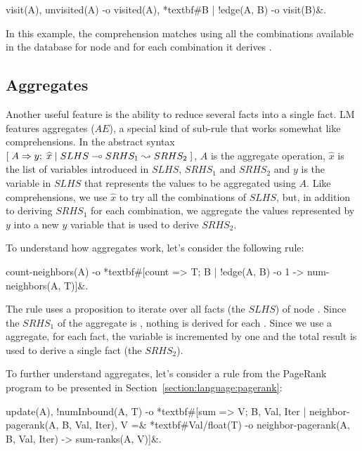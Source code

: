 \begin{Code}[commandchars=\*\#\&]
visit(A),
unvisited(A)
   -o visited(A),
      *textbf#{B | !edge(A, B) -o visit(B)}&.
\end{Code}

In this example, the comprehension matches  using all the
combinations available in the database for node  and for each
combination it derives .

\subsection{Aggregates}

Another useful feature is the ability to reduce several facts
into a single fact. LM features aggregates ($AE$), a special kind of sub-rule
that works somewhat like comprehensions. In the abstract syntax
$[\; A \Rightarrow y; \; \widehat{x} \; | \; SLHS \multimap SRHS_1 \leadsto SRHS_2 \;]$, $A$ is the aggregate
operation, $\widehat{x}$ is the list of variables introduced in $SLHS$, $SRHS_1$
and $SRHS_2$ and $y$ is the variable in $SLHS$ that represents the values to be
aggregated using $A$. Like comprehensions, we use $\widehat{x}$ to try all the
combinations of $SLHS$, but, in addition to deriving $SRHS_1$ for each
combination, we aggregate the values represented by $y$ into a new $y$ variable
that is used to derive $SRHS_2$.

To understand how aggregates work, let's consider the following rule:

\begin{Code}[commandchars=\*\#\&]
count-neighbors(A) -o *textbf#[count => T; B | !edge(A, B) -o 1 -> num-neighbors(A, T)]&.
\end{Code}

The rule uses a  proposition to iterate over all
 facts (the $SLHS$) of node . Since the $SRHS_1$ of the
aggregate is , nothing is derived for each . Since we use a
 aggregate, for each  fact, the variable  is
incremented by one and the total result is used to derive a single
 fact (the $SRHS_2$).

To further understand aggregates, let's consider a rule from the PageRank
program to be presented in Section~\ref{section:language:pagerank}:

\begin{Code}[commandchars=\*\#\&]
update(A),
!numInbound(A, T)
   -o *textbf#[sum => V; B, Val, Iter | neighbor-pagerank(A, B, Val, Iter), V =&
         *textbf#Val/float(T) -o neighbor-pagerank(A, B, Val, Iter) -> sum-ranks(A, V)]&.
\end{Code}

